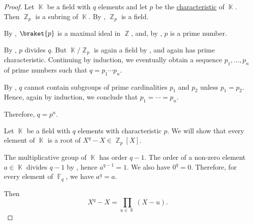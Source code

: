 \begin{proof}
   Let \( \BbbK \) be a field with \( q \) elements and let \( p \) be the \hyperref[def:ring_characteristic]{characteristic} of \( \BbbK \). Then \( \BbbZ_p \) is a subring of \( \BbbK \). By , \( \BbbZ_p \) is a field.

  By , \( \braket{ p } \) is a maximal ideal in \( \BbbZ \), and, by , \( p \) is a prime number.

  By , \( p \) divides \( q \). But \( \BbbK / \BbbZ_p \) is again a field by , and again has prime characteristic. Continuing by induction, we eventually obtain a sequence \( p_1, \ldots, p_n \) of prime numbers such that \( q = p_1 \cdots p_n \).

  By , \( q \) cannot contain subgroups of prime cardinalities \( p_1 \) and \( p_2 \) unless \( p_1 = p_2 \). Hence, again by induction, we conclude that \( p_1 = \cdots = p_n \).

  Therefore, \( q = p^n \).

   Let \( \BbbK \) be a field with \( q \) elements with characteristic \( p \). We will show that every element of \( \BbbK \) is a root of \( X^q - X \in \BbbZ_p[X] \).

  The multiplicative group of \( \BbbK \) has order \( q - 1 \). The order of a non-zero element \( a \in \BbbK \) divides \( q - 1 \) by , hence \( a^{q - 1} = 1 \). We also have \( 0^q = 0 \). Therefore, for every element of \( \BbbF_q \), we have \( a^q = a \).

  Then
  \begin{equation*}
    X^q - X = \prod_{u \in \BbbK} (X - u).
  \end{equation*}
\end{proof}

